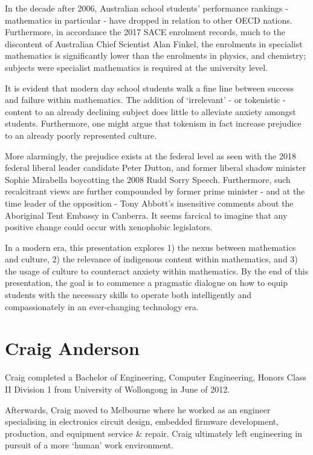 \documentclass[twoside,14pt,a4paper,notitlepage]{memoir}
\begin{document}
In the decade after 2006, Australian school students’ performance rankings - mathematics in particular - have dropped in relation to other OECD nations. Furthermore, in accordance the 2017 SACE enrolment records, much to the discontent of Australian Chief Scientist Alan Finkel, the enrolments in specialist mathematics is significantly lower than the enrolments in physics, and chemistry; subjects were specialist mathematics is required at the university level.
 
It is evident that modern day school students walk a fine line between success and failure within mathematics. The addition of ‘irrelevant’ - or tokenistic - content to an already declining subject does little to alleviate anxiety amongst students. Furthermore, one might argue that tokenism in fact increase prejudice to an already poorly represented culture.
 
More alarmingly, the prejudice exists at the federal level as seen with the 2018 federal liberal leader candidate Peter Dutton, and former liberal shadow minister Sophie Mirabella boycotting the 2008 Rudd Sorry Speech. Furthermore, such recalcitrant views are further compounded by former prime minister - and at the time leader of the opposition - Tony Abbott’s insensitive comments about the Aboriginal Tent Embassy in Canberra. It seems farcical to imagine that any positive change could occur with xenophobic legislators.
 
In a modern era, this presentation explores 1) the nexus between mathematics and culture, 2) the relevance of indigenous content within mathematics, and 3) the usage of culture to counteract anxiety within mathematics. By the end of this presentation, the goal is to commence a pragmatic dialogue on how to equip students with the necessary skills to operate both intelligently and compassionately in an ever-changing technology era.

\section*{Craig Anderson}

Craig completed a Bachelor of Engineering, Computer Engineering, Honors Class II Division 1 from University of Wollongong in June of 2012.

Afterwards, Craig moved to Melbourne where he worked as an engineer specialising in electronics circuit design, embedded firmware development, production, and equipment service \& repair. Craig ultimately left engineering in pursuit of a more ‘human’ work environment.
\end{document}
